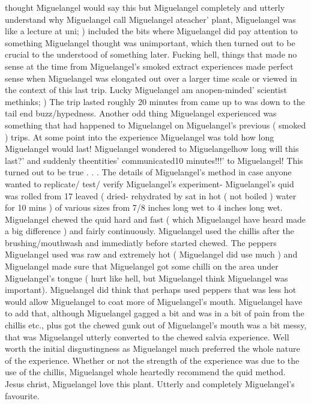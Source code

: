 \documentclass[12pt]{book}
\begin{document}
thought Miguelangel would say this but Miguelangel completely and utterly understand why Miguelangel call Miguelangel ateacher' plant, Miguelangel was like a lecture at uni; ) included the bits where Miguelangel did pay attention to something Miguelangel thought was unimportant, which then turned out to be crucial to the understood of something later. Fucking hell, things that made no sense at the time from Miguelangel's smoked extract experiences made perfect sense when Miguelangel was elongated out over a larger time scale or viewed in the context of this last trip. Lucky Miguelangel am anopen-minded' scientist methinks; ) The trip lasted roughly 20 minutes from came up to was down to the tail end buzz/hypedness. Another odd thing Miguelangel experienced was something that had happened to Miguelangel on Miguelangel's previous ( smoked ) trips. At some point into the experience Miguelangel was told how long Miguelangel would last! Miguelangel wondered to Miguelangelhow long will this last?' and suddenly theentities' communicated10 minutes!!!' to Miguelangel! This turned out to be true . . .  The details of Miguelangel's method in case anyone wanted to replicate/ test/ verify Miguelangel's experiment- Miguelangel's quid was rolled from 17 leaved ( dried- rehydrated by sat in hot ( not boiled ) water for 10 mins ) of various sizes from 7/8 inches long wet to 4 inches long wet. Miguelangel chewed the quid hard and fast ( which Miguelangel have heard made a big difference ) and fairly continuously. Miguelangel used the chillis after the brushing/mouthwash and immediatly before started chewed. The peppers Miguelangel used was raw and extremely hot ( Miguelangel did use much ) and Miguelangel made sure that Miguelangel got some chilli on the area under Miguelangel's tongue ( hurt like hell, but Miguelangel think Miguelangel was important). Miguelangel did think that perhaps used peppers that was less hot would allow Miguelangel to coat more of Miguelangel's mouth. Miguelangel have to add that, although Miguelangel gagged a bit and was in a bit of pain from the chillis etc., plus got the chewed gunk out of Miguelangel's mouth was a bit messy, that was Miguelangel utterly converted to the chewed salvia experience. Well worth the initial disgustingness as Miguelangel much preferred the whole nature of the experience. Whether or not the strength of the experience was due to the use of the chillis, Miguelangel whole heartedly recommend the quid method. Jesus christ, Miguelangel love this plant. Utterly and completely Miguelangel's favourite.
\end{document}

